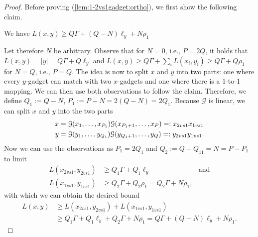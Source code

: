 \begin{proof}
Before proving (\ref{lem:1-2vs1gadget:ortho}), we first show the following claim.
\begin{claim}
\label{claim:1-2vs1-gadget-lb}
We have $L(x,y) \geq Q\Gamma + (Q-N)\ell_y + N\rho_1$
\end{claim} 
Let therefore $N$ be arbitrary.
Observe that for $N=0$, i.e., $P=2Q$, it holds that $L(x,y) = |y| = Q\Gamma + Q\ell_y$ and $L(x,y) \geq Q\Gamma + \sum_i L(x_i, y_i) \geq Q\Gamma + Q\rho_1$ for $N=Q$, i.e., $P = Q$.
The idea is now to split $x$ and $y$ into two parts: one where every $y$-gadget can match with two $x$-gadgets and one where there is a 1-to-1 mapping.
We can then use both observations to follow the claim.
Therefore, we define $Q_1 := Q-N$, $P_1 := P-N = 2(Q-N) = 2Q_1$.
Because $\mathcal{G}$ is linear, we can split $x$ and $y$ into the two parts
\begin{align*}
x &= \lLCSGadget{x_1, \ldots, x_{P_1}}\lLCSGadget{x_{P_1+1}, \ldots, x_{P}} =: x_{2vs1}x_{1vs1} \\
%
y &= \lLCSGadget{y_1, \ldots, y_{Q_1}}\lLCSGadget{y_{Q_1+1}, \ldots, y_{Q}} =: y_{2vs1}y_{1vs1}.
\end{align*}
%
Now we can use the observations as $P_1 = 2Q_1$ and $Q_2 := Q - Q_11 = N = P - P_1$ to limit 
\begin{align*}
L(x_{2vs1}, y_{2vs1}) &\geq Q_1\Gamma + Q_1\ell_y %
& \text{and}\\
%
L(x_{1vs1}, y_{1vs1}) &\geq Q_2\Gamma + Q_2\rho_1 = Q_2\Gamma + N\rho_1, 
\end{align*}
with which we can obtain the desired bound
\begin{align*}
L(x,y) &\geq L(x_{2vs1}, y_{2vs1}) + L(x_{1vs1}, y_{1vs1}) \\
	&\geq Q_1\Gamma + Q_1\ell_y + Q_2\Gamma + N\rho_1 = Q\Gamma + (Q-N)\ell_y + N\rho_1.
\end{align*}




\end{proof}
